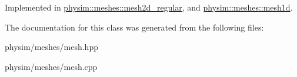 Implemented in \hyperlink{classphysim_1_1meshes_1_1mesh2d__regular_aaf4e82b9231d79624224c3462cc18809}{physim\+::meshes\+::mesh2d\+\_\+regular}, and \hyperlink{classphysim_1_1meshes_1_1mesh1d_abc53d477a2999654e09cabb0b5fd15ff}{physim\+::meshes\+::mesh1d}.



The documentation for this class was generated from the following files\+:\begin{DoxyCompactItemize}
\item 
physim/meshes/mesh.\+hpp\item 
physim/meshes/mesh.\+cpp\end{DoxyCompactItemize}
